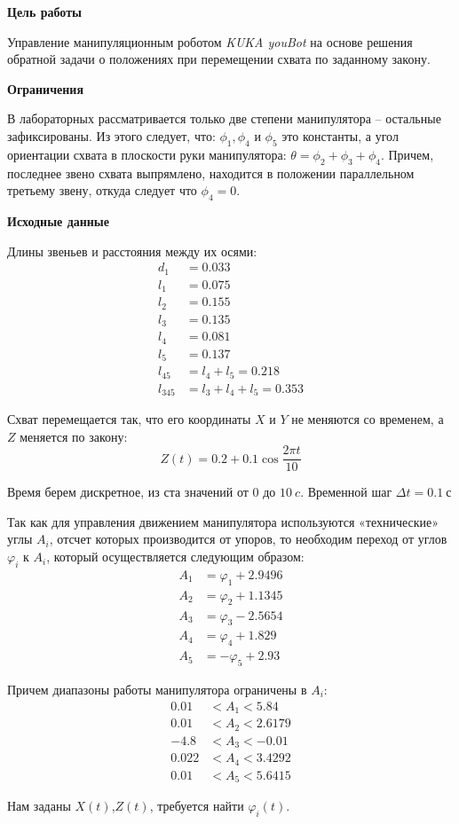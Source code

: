 
\textbf{Цель работы} 

Управление манипуляционным роботом \textit{KUKA youBot} на основе решения обратной задачи о положениях при перемещении схвата по заданному закону.

\textbf{Ограничения}

В лабораторных рассматривается только две степени манипулятора -- остальные зафиксированы. Из этого следует, что: $ \phi_1, \phi_4 $ и $ \phi_5 $ это константы, а угол ориентации схвата в плоскости руки манипулятора: $\theta = \phi_2+\phi_3+\phi_4$. Причем, последнее звено схвата выпрямлено, находится в положении параллельном третьему звену, откуда следует что $ \phi_4=0 $.

\textbf{Исходные данные}

Длины звеньев и расстояния между их осями:
\begin{align*}
    d_1 &= 0.033 \\
    l_1 &= 0.075 \\
    l_2 &= 0.155 \\
    l_3 &= 0.135 \\
    l_4 &= 0.081 \\
    l_5 &= 0.137 \\
    l_{45} &= l_4+l_5 = 0.218 \\
    l_{345} &= l_3 + l_4 + l_5 = 0.353
\end{align*}

Схват перемещается так, что его координаты $X$ и $Y$ не меняются со временем, а $Z$ меняется по закону:
$$ Z(t) = 0.2 + 0.1 \cos \frac{2 \pi t}{10} $$

Время берем дискретное, из ста значений от $0$ до $10 \: c$. Временной шаг $ \Delta t = 0.1 \: с $

Так как для управления движением манипулятора используются «технические» углы $A_i$, отсчет которых производится от упоров, то необходим переход от углов $\varphi_i$ к $A_i$, который осуществляется следующим образом:
\begin{align*}
    A_1 &= \varphi_1+2.9496 \\
    A_2 &= \varphi_2+1.1345 \\
    A_3 &= \varphi_3-2.5654 \\
    A_4 &= \varphi_4+1.829 \\
    A_5 &= -\varphi_5+2.93 
\end{align*}

Причем диапазоны работы манипулятора ограничены в $A_i$:
\begin{align*}
   0.01 &< A_1 < 5.84 \\
   0.01 &< A_2 < 2.6179 \\
   -4.8 &< A_3 < -0.01 \\
   0.022 &< A_4 < 3.4292 \\
   0.01 &< A_5 < 5.6415 
\end{align*}

Нам заданы $X(t)$,$Z(t)$, требуется найти $\varphi_i (t)$.